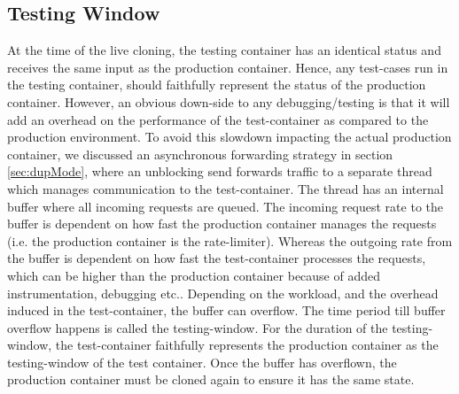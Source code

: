 \subsection{Testing Window}
\label{sec:window}

At the time of the live cloning, the testing container has an identical status and receives the same input as the production container. 
Hence, any test-cases run in the testing container, should faithfully represent the status of the production container.
However, an obvious down-side to any debugging/testing is that it will add an overhead on the performance of the test-container as compared to the production environment.
To avoid this slowdown impacting the actual production container, we discussed an asynchronous forwarding strategy in section \ref{sec:dupMode}, where an unblocking send forwards traffic to a separate thread which manages communication to the test-container. 
The thread has an internal buffer where all incoming requests are queued. 
The incoming request rate to the buffer is dependent on how fast the production container manages the requests (i.e. the production container is the rate-limiter).
Whereas the outgoing rate from the buffer is dependent on how fast the test-container processes the requests, which can be higher than the production container because of added instrumentation, debugging etc..
Depending on the workload, and the overhead induced in the test-container, the buffer can overflow. 
The time period till buffer overflow happens is called the testing-window.
For the duration of the testing-window, the test-container faithfully represents the production container as the testing-window of the test container. 
Once the buffer has overflown, the production container must be cloned again to ensure it has the same state.

